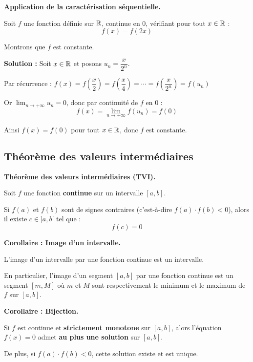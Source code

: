 \documentclass[../PolyS2.tex]{subfiles}
\begin{document}
\begin{Ex}
\textbf{Application de la caractérisation séquentielle.}

Soit $f$ une fonction définie sur $\mathbb{R}$, continue en $0$, vérifiant pour tout $x \in \mathbb{R}$ :
$$f(x) = f(2x)$$

Montrons que $f$ est constante.

\textbf{Solution :} Soit $x \in \mathbb{R}$ et posons $u_n = \dfrac{x}{2^n}$.

Par récurrence : $f(x) = f\left(\dfrac{x}{2}\right) = f\left(\dfrac{x}{4}\right) = \cdots = f\left(\dfrac{x}{2^n}\right) = f(u_n)$

Or $\displaystyle\lim_{n \to +\infty} u_n = 0$, donc par continuité de $f$ en 0 :
$$f(x) = \lim_{n \to +\infty} f(u_n) = f(0)$$

Ainsi $f(x) = f(0)$ pour tout $x \in \mathbb{R}$, donc $f$ est constante.
\end{Ex}

\subsection{Théorème des valeurs intermédiaires}

\begin{Thm}
\textbf{Théorème des valeurs intermédiaires (TVI).}

Soit $f$ une fonction \textbf{continue} sur un intervalle $[a, b]$.

Si $f(a)$ et $f(b)$ sont de signes contraires (c'est-à-dire $f(a) \cdot f(b) < 0$), alors il existe $c \in ]a, b[$ tel que :
$$f(c) = 0$$
\end{Thm}

\begin{Prop}
\textbf{Corollaire : Image d'un intervalle.}

L'image d'un intervalle par une fonction continue est un intervalle.

En particulier, l'image d'un segment $[a, b]$ par une fonction continue est un segment $[m, M]$ où $m$ et $M$ sont respectivement le minimum et le maximum de $f$ sur $[a, b]$.
\end{Prop}

\begin{Thm}
\textbf{Corollaire : Bijection.}

Si $f$ est continue et \textbf{strictement monotone} sur $[a, b]$, alors l'équation $f(x) = 0$ admet \textbf{au plus une solution} sur $[a, b]$.

De plus, si $f(a) \cdot f(b) < 0$, cette solution existe et est unique.
\end{Thm}
\end{document}
